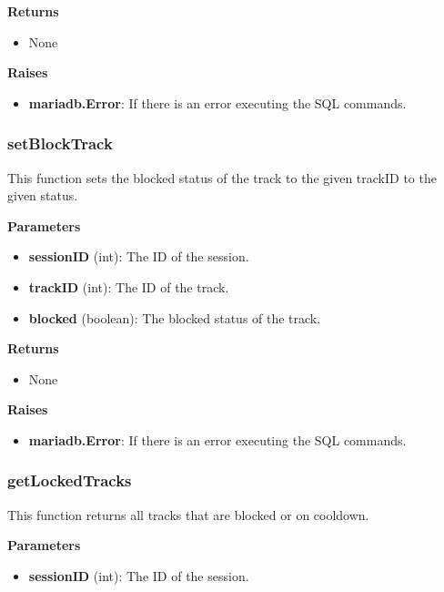 \documentclass[oneside, nenglish]{sdqtechreport}
\begin{document}
\begin{itemize}
\textbf{Returns}

\begin{itemize} \item None \end{itemize}

\textbf{Raises}

\begin{itemize} \item \textbf{mariadb.Error}: If there is an error executing the SQL commands. \end{itemize}

\subsubsection{setBlockTrack}

This function sets the blocked status of the track to the given trackID to the given status.

\textbf{Parameters}

\begin{itemize} \item \textbf{sessionID} (int): The ID of the session. \item \textbf{trackID} (int): The ID of the track. \item \textbf{blocked} (boolean): The blocked status of the track. \end{itemize}

\textbf{Returns}

\begin{itemize} \item None \end{itemize}

\textbf{Raises}

\begin{itemize} \item \textbf{mariadb.Error}: If there is an error executing the SQL commands. \end{itemize}

\subsubsection{getLockedTracks}

This function returns all tracks that are blocked or on cooldown.

\textbf{Parameters}

\begin{itemize}
    \item \textbf{sessionID} (int): The ID of the session.
\end{itemize}


\end{itemize}
\end{document}

